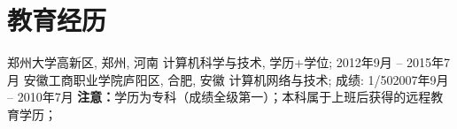 \section{\textbf{教育经历}}
  \resumeSubHeadingListStart
    \resumeSubheading
      {郑州大学}{高新区, 郑州, 河南}
      {计算机科学与技术, 学历+学位; }{2012年9月 -- 2015年7月}
    \resumeSubheading
      {安徽工商职业学院}{庐阳区, 合肥, 安徽}
      {计算机网络与技术; 成绩: 1/50}{2007年9月 -- 2010年7月}
  \resumeSubHeadingListEnd
  \vspace{10pt}\noindent\scriptsize {\textbf{注意：}学历为专科（成绩全级第一）；本科属于上班后获得的远程教育学历；}
  \normalsize